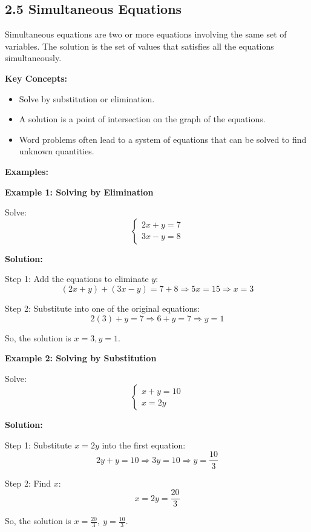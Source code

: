 
\subsection*{2.5 Simultaneous Equations}

Simultaneous equations are two or more equations involving the same set of variables. The solution is the set of values that satisfies all the equations simultaneously.

\textbf{Key Concepts:}
\begin{itemize}
    \item Solve by substitution or elimination.
    \item A solution is a point of intersection on the graph of the equations.
    \item Word problems often lead to a system of equations that can be solved to find unknown quantities.
\end{itemize}

\textbf{Examples:}

\begin{flushleft}
\textbf{Example 1: Solving by Elimination}

Solve:  
\[
\begin{cases}
2x + y = 7 \\
3x - y = 8
\end{cases}
\]

\textbf{Solution:} \vspace{0.2cm}

Step 1: Add the equations to eliminate \(y\):  
\[
(2x + y) + (3x - y) = 7 + 8 \Rightarrow 5x = 15
\Rightarrow x = 3
\]

Step 2: Substitute into one of the original equations:  
\[
2(3) + y = 7 \Rightarrow 6 + y = 7 \Rightarrow y = 1
\]

So, the solution is \( \boxed{x = 3, y = 1} \).
\end{flushleft}

\begin{flushleft}
\textbf{Example 2: Solving by Substitution}

Solve:  
\[
\begin{cases}
x + y = 10 \\
x = 2y
\end{cases}
\]

\textbf{Solution:} \vspace{0.2cm}

Step 1: Substitute \(x = 2y\) into the first equation:  
\[
2y + y = 10 \Rightarrow 3y = 10 \Rightarrow y = \frac{10}{3}
\]

Step 2: Find \(x\):  
\[
x = 2y = \frac{20}{3}
\]

So, the solution is \( \boxed{x = \frac{20}{3},\ y = \frac{10}{3}} \).
\end{flushleft}


